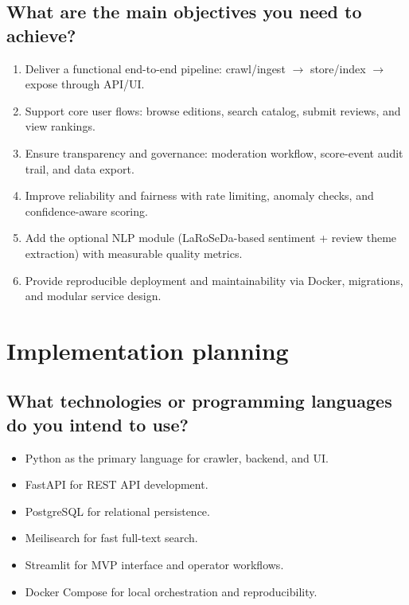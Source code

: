 \documentclass[12pt,a4paper]{article}
\begin{document}
\subsection{What are the main objectives you need to achieve?}
\begin{enumerate}[leftmargin=*]
	\item Deliver a functional end-to-end pipeline: crawl/ingest $\rightarrow$ store/index $\rightarrow$ expose through API/UI.
	\item Support core user flows: browse editions, search catalog, submit reviews, and view rankings.
	\item Ensure transparency and governance: moderation workflow, score-event audit trail, and data export.
	\item Improve reliability and fairness with rate limiting, anomaly checks, and confidence-aware scoring.
	\item Add the optional NLP module (LaRoSeDa-based sentiment + review theme extraction) with measurable quality metrics.
	\item Provide reproducible deployment and maintainability via Docker, migrations, and modular service design.
\end{enumerate}

\section{Implementation planning}

\subsection{What technologies or programming languages do you intend to use?}
\begin{itemize}[leftmargin=*]
	\item Python as the primary language for crawler, backend, and UI.
	\item FastAPI for REST API development.
	\item PostgreSQL for relational persistence.
	\item Meilisearch for fast full-text search.
	\item Streamlit for MVP interface and operator workflows.
	\item Docker Compose for local orchestration and reproducibility.
\end{itemize}
\end{document}
